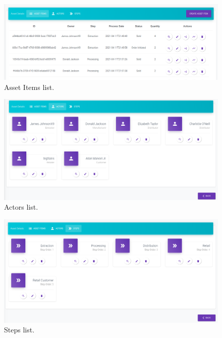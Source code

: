 


\begin{figure}[H]
\setlength{\belowcaptionskip}{-10pt}
\begin{center}
  \includegraphics[scale=0.35]{images/use_example/06_asset_Item_list.png}
\caption{Asset Items list.}
\label{fig:asset_item_list}
\end{center}
\end{figure}

\begin{figure}[H]
\begin{center}
  \includegraphics[scale=0.34]{images/use_example/07_actor_list.png}
\caption{Actors list.}
\label{fig:actor_list}
\end{center}
\end{figure}

\begin{figure}[H]
\begin{center}
  \includegraphics[scale=0.32]{images/use_example/08_steps_list.png}
\caption{Steps list.}
\label{fig:step_list}
\end{center}
\end{figure}

